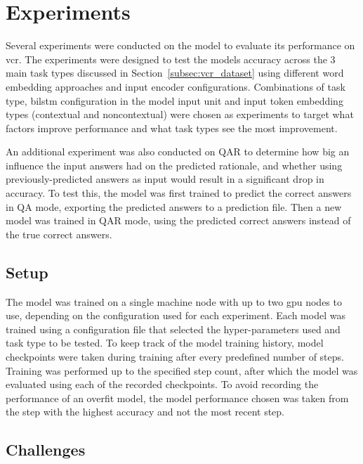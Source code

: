 \section{Experiments}
\label{sec:experiments}

Several experiments were conducted on the model to evaluate its performance on \gls{vcr}.
The experiments were designed to test the models accuracy across the 3 main task types discussed in Section~\ref{subsec:vcr_dataset} using different word embedding approaches and input encoder configurations.
Combinations of task type, \gls{bilstm} configuration in the model input unit and input token embedding types (contextual and noncontextual) were chosen as experiments to target what factors improve performance and what task types see the most improvement.

An additional experiment was also conducted on QA\rightarrow{}R to determine how big an influence the input answers had on the predicted rationale, and whether using previously-predicted answers as input would result in a significant drop in accuracy.
To test this, the model was first trained to predict the correct answers in Q\rightarrow{}A mode, exporting the predicted answers to a prediction file.
Then a new model was trained in QA\rightarrow{}R mode, using the predicted correct answers instead of the true correct answers.

\subsection{Setup}
\label{subsec:experiment-setup}

The model was trained on a single machine node with up to two \acrshort{gpu} nodes to use, depending on the configuration used for each experiment.
Each model was trained using a configuration file that selected the hyper-parameters used and task type to be tested.
To keep track of the model training history, model checkpoints were taken during training after every predefined number of steps.
Training was performed up to the specified step count, after which the model was evaluated using each of the recorded checkpoints.
To avoid recording the performance of an overfit model, the model performance chosen was taken from the step with the highest accuracy and not the most recent step.

\subsection{Challenges}
\label{subsec:experiment-challenges}

